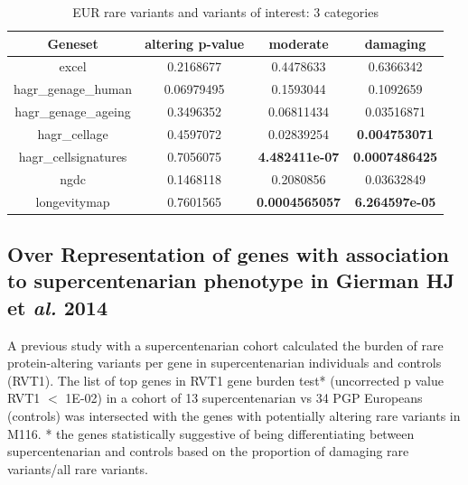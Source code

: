 \documentclass{article}\usepackage[]{graphicx}\usepackage[dvipsnames]{xcolor}
\begin{document}
\begin{table}[h!]
\centering
 \caption{EUR rare variants and variants of interest: 3 categories}
 \begin{tabular}{|c c c c|} 
 \hline
Geneset &  altering p-value  & moderate & damaging \\ [0.5ex] 
 \hline\hline
excel & 0.2168677  & 0.4478633 &  0.6366342 \\
hagr\_genage\_human & 0.06979495 & 0.1593044 & 0.1092659 \\
hagr\_genage\_ageing & 0.3496352 & 0.06811434 & 0.03516871 \\
hagr\_cellage & 0.4597072 & 0.02839254 &  \textbf{0.004753071} \\
hagr\_cellsignatures & 0.7056075 & \textbf{4.482411e-07} & \textbf{0.0007486425} \\
ngdc & 0.1468118 & 0.2080856 & 0.03632849 \\
longevitymap & 0.7601565 & \textbf{0.0004565057} & \textbf{6.264597e-05} \\[1ex] 
\hline
 \end{tabular}
\label{table:table:ORAmanelper}
\end{table}




\subsection{Over Representation of genes with association to supercentenarian phenotype in Gierman HJ et \textit{al.} 2014\cite{gierman2014whole}}
\label{sec:funSC}

A previous study with a supercentenarian cohort \cite{gierman2014whole} calculated the burden of rare protein-altering variants per gene in supercentenarian individuals and controls (RVT1).
The list of top genes in RVT1 gene burden test* (uncorrected p value RVT1 $<$ 1E-02) in a cohort of 13 supercentenarian vs 34 PGP Europeans (controls) was intersected with the genes with potentially altering rare variants in M116.
* the genes statistically suggestive of being differentiating between supercentenarian and controls based on the proportion of damaging rare variants/all rare variants.
\end{document}

